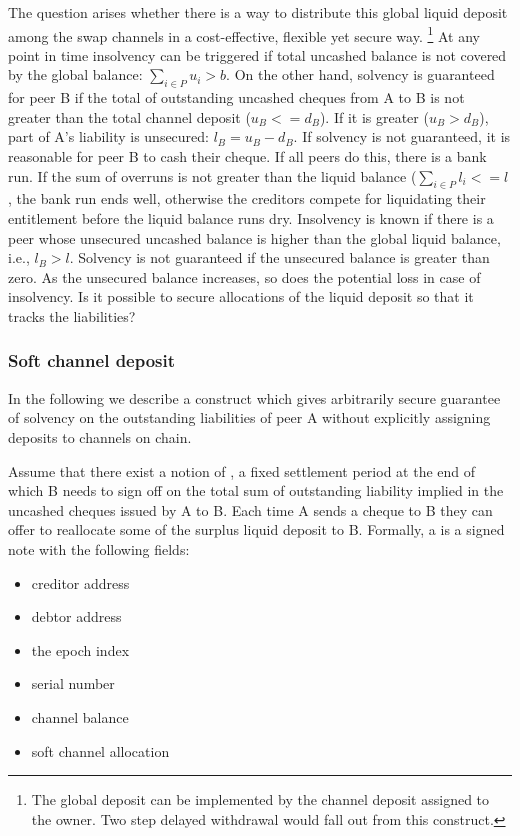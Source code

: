 The question arises whether there is a way to distribute this global liquid deposit among the swap channels in a cost-effective, flexible yet secure way.%
%
\footnote{The global deposit can be implemented by the channel deposit assigned to the owner. Two step delayed withdrawal would fall out from this construct.}
%
At any point in time insolvency can be triggered if total uncashed balance is not covered by the global balance: $\sum_{i\in P}u_i > b$. On the other hand, solvency is guaranteed for peer B if the total of outstanding uncashed cheques from A to B is not greater than the total channel deposit ($u_B <= d_B$). If it is greater ($u_B > d_B$), part of A's liability is unsecured: $l_B = u_B - d_B$. If solvency is not guaranteed, it is reasonable for peer B to cash their cheque. If all peers do this, there is a bank run. If the sum of overruns is not greater than the liquid balance ($\sum_{i\in P}l_i <= l$, the bank run ends well, otherwise the creditors compete for liquidating their entitlement before the liquid balance runs dry. 
Insolvency is known if there is a peer whose unsecured uncashed balance is higher than the global liquid balance, i.e., $l_B > l$.
Solvency is not guaranteed if the unsecured balance is greater than zero. As the unsecured balance increases, so does the potential loss in case of insolvency. Is it possible to secure allocations of the liquid deposit so that it tracks the liabilities? 

\subsubsection{Soft channel deposit}

In the following we describe a construct which gives arbitrarily secure guarantee of solvency on the outstanding liabilities of peer A without explicitly assigning deposits to channels on chain.

Assume that there exist a notion of , a fixed settlement period at the end of which B needs to sign off on the total sum of outstanding liability implied in the uncashed cheques issued by A to B.
Each time A sends a cheque to B they can offer to reallocate some of the surplus liquid deposit to B.
Formally, a  is a signed note with the following fields:

\begin{itemize}
  \item creditor address
  \item debtor address
  \item the epoch index
  \item serial number
  \item channel balance
  \item soft channel allocation
\end{itemize}

